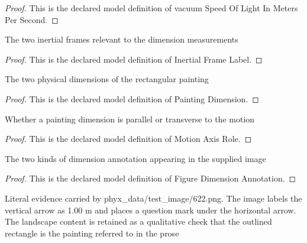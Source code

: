 \begin{proof}
  This is the declared model definition of vacuum Speed Of Light In Meters Per Second.
\end{proof}
\begin{definition}
  \label{def:physics:phyx-mini-0622:phyxminiproblems-problemphyxmini0622-inertialframelabel}
  The two inertial frames relevant to the dimension measurements
\end{definition}
\begin{proof}
  This is the declared model definition of Inertial Frame Label.
\end{proof}
\begin{definition}
  \label{def:physics:phyx-mini-0622:phyxminiproblems-problemphyxmini0622-paintingdimension}
  The two physical dimensions of the rectangular painting
\end{definition}
\begin{proof}
  This is the declared model definition of Painting Dimension.
\end{proof}
\begin{definition}
  \label{def:physics:phyx-mini-0622:phyxminiproblems-problemphyxmini0622-motionaxisrole}
  Whether a painting dimension is parallel or transverse to the motion
\end{definition}
\begin{proof}
  This is the declared model definition of Motion Axis Role.
\end{proof}
\begin{definition}
  \label{def:physics:phyx-mini-0622:phyxminiproblems-problemphyxmini0622-figuredimensionannotation}
  The two kinds of dimension annotation appearing in the supplied image
\end{definition}
\begin{proof}
  This is the declared model definition of Figure Dimension Annotation.
\end{proof}
\begin{definition}
  \label{def:physics:phyx-mini-0622:phyxminiproblems-problemphyxmini0622-paintingfigure}
  Literal evidence carried by phyx\_data/test\_image/622.png. The image labels the vertical arrow as 1.00 m and places a question mark under the horizontal arrow. The landscape content is retained as a qualitative check that the outlined rectangle is the painting referred to in the prose
\end{definition}
